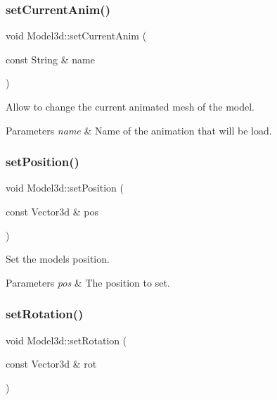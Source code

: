 \subsubsection{\texorpdfstring{set\+Current\+Anim()}{setCurrentAnim()}}
{\footnotesize\ttfamily void Model3d\+::set\+Current\+Anim (\begin{DoxyParamCaption}\item[{const String \&}]{name }\end{DoxyParamCaption})}



Allow to change the current animated mesh of the model. 


\begin{DoxyParams}{Parameters}
{\em name} & Name of the animation that will be load. \\
\hline
\end{DoxyParams}
\mbox{\label{classModel3d_a971b77ce978903443e71187ceafa1528}} 
\subsubsection{\texorpdfstring{set\+Position()}{setPosition()}}
{\footnotesize\ttfamily void Model3d\+::set\+Position (\begin{DoxyParamCaption}\item[{const Vector3d \&}]{pos }\end{DoxyParamCaption})}



Set the model\textquotesingle{}s position. 


\begin{DoxyParams}{Parameters}
{\em pos} & The position to set. \\
\hline
\end{DoxyParams}
\mbox{\label{classModel3d_adc3c185a679687b4bf483f89eb2c20a9}} 
\subsubsection{\texorpdfstring{set\+Rotation()}{setRotation()}}
{\footnotesize\ttfamily void Model3d\+::set\+Rotation (\begin{DoxyParamCaption}\item[{const Vector3d \&}]{rot }\end{DoxyParamCaption})}



